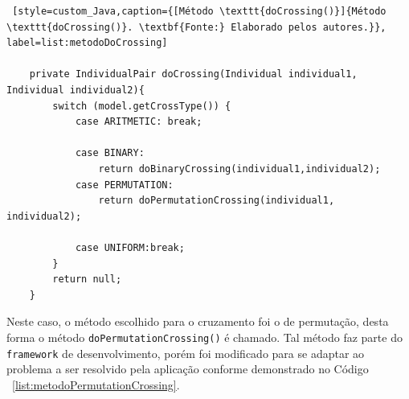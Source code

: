 \begin{lstlisting} [style=custom_Java,caption={[Método \texttt{doCrossing()}]{Método \texttt{doCrossing()}. \textbf{Fonte:} Elaborado pelos autores.}}, label=list:metodoDoCrossing] 

	private IndividualPair doCrossing(Individual individual1, Individual individual2){
		switch (model.getCrossType()) {
			case ARITMETIC: break;
			
			case BINARY: 
				return doBinaryCrossing(individual1,individual2);
			case PERMUTATION: 
				return doPermutationCrossing(individual1, individual2);
		
			case UNIFORM:break;
		}
		return null;
	}

\end{lstlisting}


\par Neste caso, o método escolhido para o cruzamento foi o de permutação, desta forma o método \texttt{doPermutationCrossing()} é chamado.
Tal método faz parte do \texttt{framework} de desenvolvimento, porém foi modificado para se adaptar ao problema a ser resolvido pela 
aplicação conforme demonstrado no Código ~\ref{list:metodoPermutationCrossing}.


